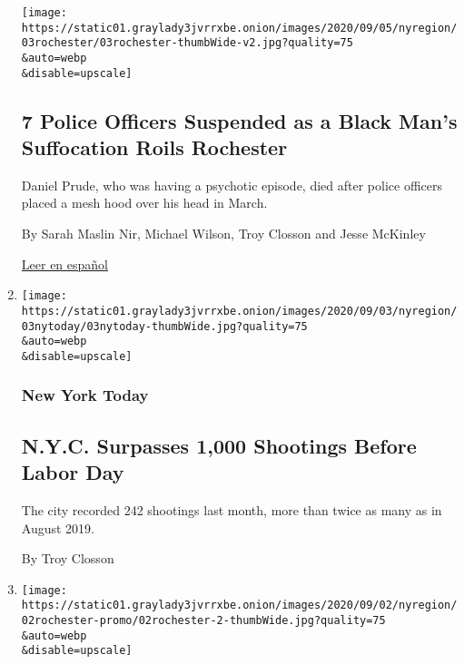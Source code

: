 \begin{enumerate}
  \texttt{[image: https://static01.graylady3jvrrxbe.onion/images/2020/09/05/nyregion/03rochester/03rochester-thumbWide-v2.jpg?quality=75\\\&auto=webp\\\&disable=upscale]}

  \hypertarget{7-police-officers-suspended-as-a-black-mans-suffocation-roils-rochester}{%
  \subsection{7 Police Officers Suspended as a Black Man's Suffocation
  Roils
  Rochester}\label{7-police-officers-suspended-as-a-black-mans-suffocation-roils-rochester}}

  Daniel Prude, who was having a psychotic episode, died after police
  officers placed a mesh hood over his head in March.

  By Sarah Maslin Nir, Michael Wilson, Troy Closson and Jesse McKinley

  \href{https://www.nytimes3xbfgragh.onion/es/2020/09/04/espanol/estados-unidos/daniel-prude-rochester-policia.html}{Leer
  en español}
\item
  \href{/2020/09/03/nyregion/nyc-shootings.html}{}

  \texttt{[image: https://static01.graylady3jvrrxbe.onion/images/2020/09/03/nyregion/03nytoday/03nytoday-thumbWide.jpg?quality=75\\\&auto=webp\\\&disable=upscale]}

  \hypertarget{new-york-today}{%
  \subsubsection{New York Today}\label{new-york-today}}

  \hypertarget{nyc-surpasses-1000-shootings-before-labor-day}{%
  \subsection{N.Y.C. Surpasses 1,000 Shootings Before Labor
  Day}\label{nyc-surpasses-1000-shootings-before-labor-day}}

  The city recorded 242 shootings last month, more than twice as many as
  in August 2019.

  By Troy Closson
\item
  \href{/2020/09/02/nyregion/daniel-prude-rochester-police.html}{}

  \texttt{[image: https://static01.graylady3jvrrxbe.onion/images/2020/09/02/nyregion/02rochester-promo/02rochester-2-thumbWide.jpg?quality=75\\\&auto=webp\\\&disable=upscale]}


\end{enumerate}
